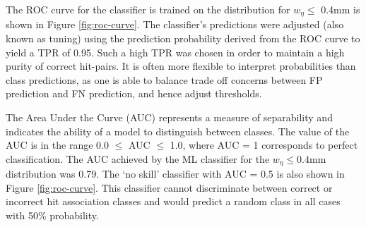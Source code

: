 The ROC curve for the classifier is trained on the distribution for $w_{\eta} \le$ 0.4mm is shown in Figure \ref{fig:roc-curve}. The classifier’s predictions were adjusted (also known as tuning) using the prediction probability derived from the ROC curve to yield a TPR of 0.95. Such a high TPR was chosen in order to maintain a high purity of correct hit-pairs. It is often more flexible to interpret probabilities than class predictions, as one is able to balance trade off concerns between FP prediction and FN prediction, and hence adjust thresholds.

The Area Under the Curve (AUC) represents a measure of separability and indicates the ability of a model to distinguish between classes. The value of the AUC is in the range 0.0 $\leq$ AUC $\leq$ 1.0, where AUC = 1 corresponds to perfect classification. The AUC achieved by the ML classifier for the $w_{\eta} \leq 0.4$mm distribution was 0.79. The ‘no skill’ classifier with AUC = 0.5 is also shown in Figure \ref{fig:roc-curve}. This classifier cannot discriminate between correct or incorrect hit association classes and would predict a random class in all cases with 50\% probability.



